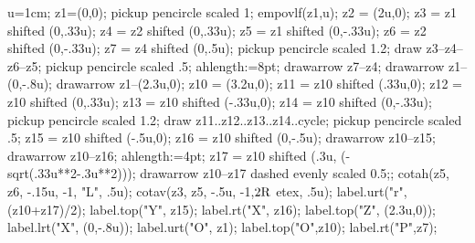 \documentclass[12pt,a4paper,twocolumn]{book} %
\begin{document}
\begin{mpdisplay}
  u=1cm;
  z1=(0,0);
  pickup pencircle scaled 1;
  empovlf(z1,u);
  z2 = (2u,0);
  z3 = z1 shifted (0,.33u);
  z4 = z2 shifted (0,.33u);
  z5 = z1 shifted (0,-.33u);
  z6 = z2 shifted (0,-.33u);
  z7 = z4 shifted (0,.5u);
  pickup pencircle scaled 1.2;
  draw z3--z4--z6--z5;
  pickup pencircle scaled .5;
  ahlength:=8pt;
  drawarrow z7--z4;
  drawarrow z1--(0,-.8u);
  drawarrow z1--(2.3u,0);
  z10 = (3.2u,0);
  z11 = z10 shifted (.33u,0);
  z12 = z10 shifted (0,.33u);
  z13 = z10 shifted (-.33u,0);
  z14 = z10 shifted (0,-.33u);
  pickup pencircle scaled 1.2;
  draw z11..z12..z13..z14..cycle;
  pickup pencircle scaled .5;
  z15 = z10 shifted (-.5u,0);
  z16 = z10 shifted (0,-.5u);
  drawarrow z10--z15;
  drawarrow z10--z16;
  ahlength:=4pt;
  z17 = z10 shifted (.3u, (-sqrt(.33u**2-.3u**2)));
  drawarrow z10--z17 dashed evenly scaled 0.5;;
  cotah(z5, z6, -.15u, -1, "L", .5u);
  cotav(z3, z5, -.5u, -1,\btex $\rm 2R$ etex, .5u);
  label.urt("r", (z10+z17)/2);
  label.top("Y", z15);
  label.rt("X", z16);
  label.top("Z", (2.3u,0));
  label.lrt("X", (0,-.8u));
  label.urt("O", z1);
  label.top("O",z10);
  label.rt("P",z7);
\end{mpdisplay}
\end{document}
